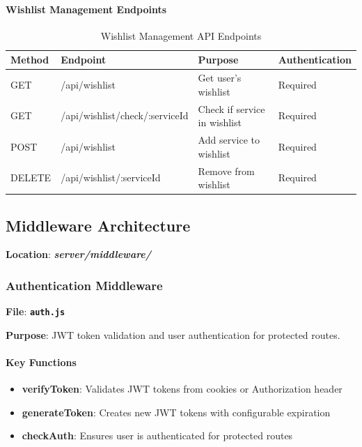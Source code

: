 \documentclass[12pt,a4paper]{article}
\newcommand{\file}[1]{\textbf{\texttt{#1}}}
\newcommand{\folder}[1]{\textbf{\textit{#1}}}
\begin{document}
\paragraph{Wishlist Management Endpoints}
\begin{table}[H]
\centering
\small
\begin{tabular}{@{}llll@{}}
\toprule
\textbf{Method} & \textbf{Endpoint} & \textbf{Purpose} & \textbf{Authentication} \\
\midrule
GET & /api/wishlist & Get user's wishlist & Required \\
GET & /api/wishlist/check/:serviceId & Check if service in wishlist & Required \\
POST & /api/wishlist & Add service to wishlist & Required \\
DELETE & /api/wishlist/:serviceId & Remove from wishlist & Required \\
\bottomrule
\end{tabular}
\caption{Wishlist Management API Endpoints}
\label{tab:wishlist-endpoints}
\end{table}

\subsection{Middleware Architecture}
\label{subsec:middleware-architecture}

\textbf{Location}: \folder{server/middleware/}

\subsubsection{Authentication Middleware}
\label{subsubsec:auth-middleware}

\textbf{File}: \file{auth.js}

\textbf{Purpose}: JWT token validation and user authentication for protected routes.

\paragraph{Key Functions}
\begin{itemize}
\item \textbf{verifyToken}: Validates JWT tokens from cookies or Authorization header
\item \textbf{generateToken}: Creates new JWT tokens with configurable expiration
\item \textbf{checkAuth}: Ensures user is authenticated for protected routes
\end{itemize}
\end{document}
